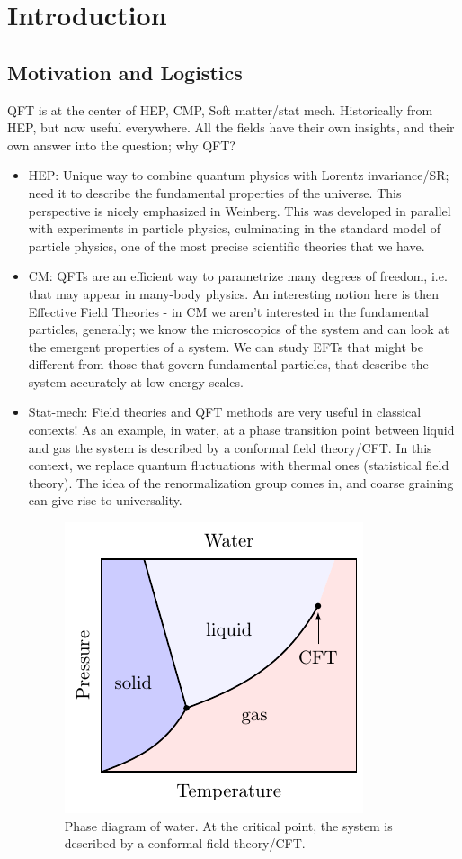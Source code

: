 \section{Introduction}
\subsection{Motivation and Logistics}
QFT is at the center of HEP, CMP, Soft matter/stat mech. Historically from HEP, but now useful everywhere. All the fields have their own insights, and their own answer into the question; why QFT?
\begin{itemize}
    \item HEP: Unique way to combine quantum physics with Lorentz invariance/SR; need it to describe the fundamental properties of the universe. This perspective is nicely emphasized in Weinberg. This was developed in parallel with experiments in particle physics, culminating in the standard model of particle physics, one of the most precise scientific theories that we have.
    \item CM: QFTs are an efficient way to parametrize many degrees of freedom, i.e. that may appear in many-body physics. An interesting notion here is then Effective Field Theories - in CM we aren't interested in the fundamental particles, generally; we know the microscopics of the system and can look at the emergent properties of a system. We can study EFTs that might be different from those that govern fundamental particles, that describe the system accurately at low-energy scales.
    \item Stat-mech: Field theories and QFT methods are very useful in classical contexts! As an example, in water, at a phase transition point between liquid and gas the system is described by a conformal field theory/CFT. In this context, we replace quantum fluctuations with thermal ones (statistical field theory). The idea of the renormalization group comes in, and coarse graining can give rise to universality.
    \begin{figure}[htbp]
        \centering
        \includegraphics{Lectures/Figures/PT_diagram.pdf}
        \caption{Phase diagram of water. At the critical point, the system is described by a conformal field theory/CFT.}
        \label{fig:waterphase}
    \end{figure}
\end{itemize}

